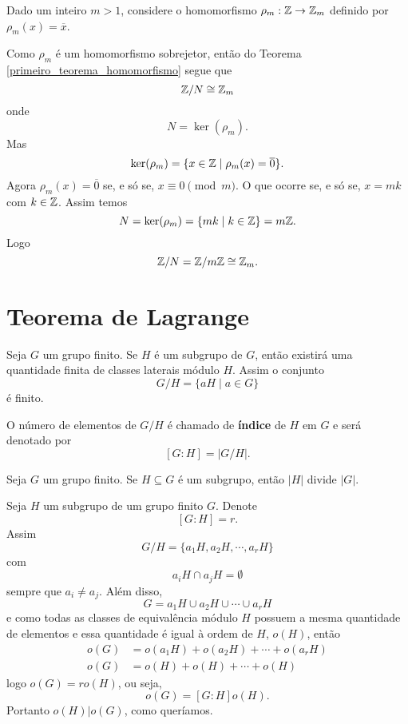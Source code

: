 \begin{exemplo}
    Dado um inteiro $m > 1$, considere o homomorfismo $\rho_m : \mathbb{Z} \to \mathbb{Z}_m$ definido por $\rho_m(x) = \overline{x}$.
\end{exemplo}
\begin{solucao}
    Como $\rho_m$ é um homomorfismo sobrejetor, então do Teorema \ref{primeiro_teorema_homomorfismo} segue que
    \[
        \mathbb{Z}/N \cong \mathbb{Z}_m
    \]
    onde
    \[
        N = \ker(\rho_m).
    \]
    Mas
    \[
        \ker(\rho_m) = \{x \in \mathbb{Z} \mid \rho_m(x) = \overline{0}\}.
    \]
    Agora $\rho_m(x) = \overline{0}$ se, e só se, $x \equiv 0 \pmod m$. O que ocorre se, e só se, $x = mk$ com $k \in \mathbb{Z}$. Assim temos
    \[
        N = \ker(\rho_m) = \{mk \mid k \in \mathbb{Z}\} = m\mathbb{Z}.
    \]
    Logo
    \[
        \mathbb{Z}/N = \mathbb{Z}/m\mathbb{Z} \cong \mathbb{Z}_m.
    \]
\end{solucao}

\section{Teorema de Lagrange}

Seja $G$ um grupo finito. Se $H$ é um subgrupo de $G$, então existirá uma quantidade finita de classes laterais módulo $H$.
Assim o conjunto
\[
    G/H = \{aH \mid a \in G\}
\]
é finito.

O n\'umero de elementos de $G/H$ é chamado de \textbf{índice} de $H$ em $G$ e será denotado por
\[
    [G : H] = |G/H|.
\]

\begin{teorema}\label{teorema_de_lagrange}
    Seja $G$ um grupo finito. Se $H\subseteq G$ é um subgrupo, então $|H|$ divide $|G|$.
\end{teorema}
\begin{prova}
    Seja $H$ um subgrupo de um grupo finito $G$. Denote
    \[
        [G : H] = r.
    \]
    Assim
    \[
        G/H = \{a_1H, a_2H, \cdots, a_rH\}
    \]
    com
    \[
        a_iH \cap a_jH = \emptyset
    \]
    sempre que $a_i \ne a_j$. Além disso,
    \[
        G = a_1H \cup a_2H \cup \cdots \cup a_rH
    \]
    e como todas as classes de equivalência módulo $H$ possuem a mesma quantidade de elementos e essa quantidade é igual à ordem de $H$, $o(H)$, então
    \begin{align*}
        o(G) &= o(a_1H) + o(a_2H) + \cdots + o(a_rH)\\
        o(G) &= o(H) + o(H) + \cdots + o(H)
    \end{align*}
    logo $o(G) = ro(H)$, ou seja,
    \[
        o(G) = [G : H]o(H).
    \]
    Portanto $o(H) | o(G)$, como queríamos.
\end{prova}

